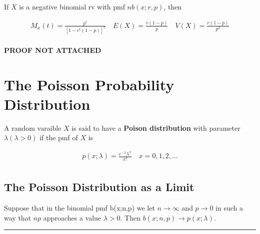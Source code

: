 \begin{proposition}
    If $X$ is a negative binomial rv with pmf $nb(x;r,p)$, then
    
    \begin{align*}
        M_x(t) = \frac{p^r}{[1-e^t(1-p)]^r}\quad E(X) = \frac{r(1-p)}{p}\quad V(X) = \frac{r(1-p)}{p^2} \\
    \end{align*}
\end{proposition}

\textbf{PROOF NOT ATTACHED}

\section{The Poisson Probability Distribution}

\begin{definition}
    A random varaible $X$ is said to have a \textbf{Poison distribution} with parameter $\lambda(\lambda > 0)$ if the pmf of $X$ is

    \begin{align*}
        p(x;\lambda) = \frac{e^{-\lambda}\lambda^x}{x!}\quad x=0,1,2,\dots \\
    \end{align*}
\end{definition}

\subsection{The Poisson Distribution as a Limit}

\begin{proposition}
    Suppose that in the binomial pmf b(x;n,p) we let $n\rightarrow\infty$ and $p\rightarrow 0$ in such a way that $np$ approaches a value $\lambda>0$. Then $b(x;n,p)\rightarrow p(x;\lambda)$.
\end{proposition}

\noindent\rule{\textwidth}{1pt}

